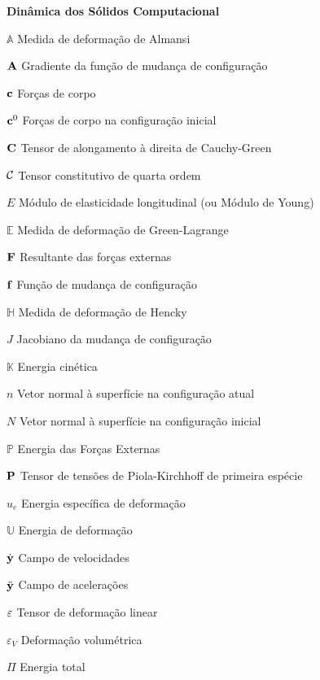 \begin{simbolos}
    \item[\textbf{Dinâmica dos Sólidos Computacional}]
    \item[$\mathbb{A}$] Medida de deformação de Almansi
    \item[$\mathbf{A}$] Gradiente da função de mudança de configuração
    \item[$\mathbf{c}$] Forças de corpo
    \item[$\mathbf{c}^0$] Forças de corpo na configuração inicial
    \item[$\mathbf{C}$] Tensor de alongamento à direita de Cauchy-Green
    \item[$\mathcal{C}$] Tensor constitutivo de quarta ordem
    \item[$E$] Módulo de elasticidade longitudinal (ou Módulo de Young)
    \item[$\mathbb{E}$] Medida de deformação de Green-Lagrange
    \item[$\mathbf{F}$] Resultante das forças externas
    \item[$\mathbf{f}$] Função de mudança de configuração
    \item[$\mathbb{H}$] Medida de deformação de Hencky
    \item[$J$] Jacobiano da mudança de configuração
    \item[$\mathbb{K}$] Energia cinética
    \item[$n$] Vetor normal à superfície na configuração atual
    \item[$N$] Vetor normal à superfície na configuração inicial
    \item[$\mathbb{P}$] Energia das Forças Externas
    \item[$\mathbf{P}$] Tensor de tensões de Piola-Kirchhoff de primeira espécie
    \item[$u_e$] Energia específica de deformação
    \item[$\mathbb{U}$] Energia de deformação
    \item[$\dot{\mathbf{y}}$] Campo de velocidades
    \item[$\ddot{\mathbf{y}}$] Campo de acelerações
    \item[$\mathbf{\varepsilon}$] Tensor de deformação linear
    \item[$\varepsilon_V$] Deformação volumétrica
    \item[$\Pi$] Energia total


\end{simbolos}
